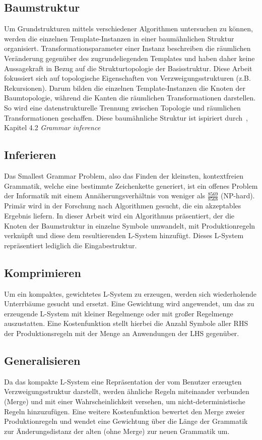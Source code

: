 \subsection*{Baumstruktur}
Um Grundstrukturen mittels verschiedener Algorithmen untersuchen zu können, werden die einzelnen Template-Instanzen in
einer baumähnlichen Struktur organisiert.
Transformationsparameter einer Instanz beschreiben die räumlichen Veränderung gegenüber des zugrundeliegenden Templates
und haben daher keine Aussagekraft in Bezug auf die Strukturtopologie der Basisstruktur.
Diese Arbeit fokussiert sich auf topologische Eigenschaften von Verzweigungsstrukturen (z.B. Rekursionen).
Darum bilden die einzelnen Template-Instanzen die Knoten der Baumtopologie, während die Kanten die räumlichen Transformationen
darstellen.
So wird eine datenstrukturelle Trennung zwischen Topologie und räumlichen Transformationen geschaffen.
Diese baumähnliche Struktur ist ispiriert durch~\cite{guo_2020}, Kapitel 4.2 \textit{Grammar inference}

\subsection*{Inferieren}
Das Smallest Grammar Problem, also das Finden der kleinsten, kontextfreien Grammatik, welche eine bestimmte Zeichenkette
generiert, ist ein offenes Problem der Informatik mit einem Annäherungsverhältnis von weniger als $\frac{8569}{8568}$
(NP-hard).
Primär wird in der Forschung nach Algorithmen gesucht, die ein akzeptables Ergebnis liefern.
In dieser Arbeit wird ein Algorithmus präsentiert, der die Knoten der Baumstruktur in einzelne Symbole umwandelt, mit
Produktionregeln verknüpft und diese dem resultierenden L-System hinzufügt.
Dieses L-System repräsentiert lediglich die Eingabestruktur.

\newpage

\subsection*{Komprimieren}
Um ein kompaktes, gewichtetes L-System zu erzeugen, werden sich wiederholende Unterrbäume gesucht und ersetzt.
Eine Gewichtung wird angewendet, um das zu erzeugende L-System mit kleiner Regelmenge oder mit
großer Regelmenge auszustatten.
Eine Kostenfunktion stellt hierbei die Anzahl Symbole aller RHS der Produktionsregeln mit der Menge an Anwendungen der
LHS gegenüber.

\subsection*{Generalisieren}
Da das kompakte L-System eine Repräsentation der vom Benutzer erzeugten Verzweigungsstruktur darstellt, werden ähnliche
Regeln miteinander verbunden (Merge) und mit einer Wahrscheinlichkeit versehen, um nicht-deterministische Regeln hinzuzufügen.
Eine weitere Kostenfunktion bewertet den Merge zweier Produktionregeln und wendet eine Gewichtung über die Länge der Grammatik
zur Änderungsdistanz der alten (ohne Merge) zur neuen Grammatik um.

